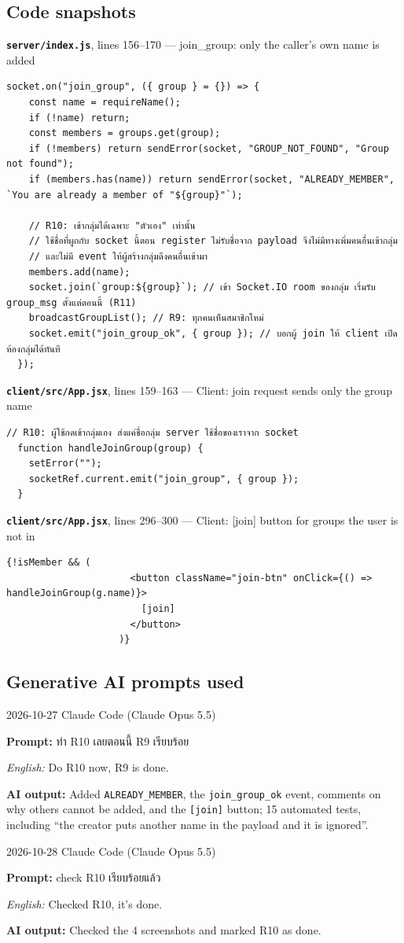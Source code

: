 \documentclass[11pt,a4paper]{article}
\newcommand{\code}[1]{\texttt{#1}}
\newcommand{\snap}[3]{\par\medskip\textbf{\code{#1}}, lines #2 --- #3}
\newcommand{\promptbox}[4]{%
\begin{tcolorbox}[colback=codebg,colframe=gray!50,boxrule=0.4pt,left=4pt,right=4pt,top=2pt,bottom=2pt]
{\small #1 \quad Claude Code (Claude Opus 5.5)}\par
\textbf{Prompt:} #2\par
\textit{English:} #3\par
\textbf{AI output:} #4
\end{tcolorbox}}
\begin{document}
\subsection*{Code snapshots}
\snap{server/index.js}{156--170}{join\_group: only the caller's own name is added}
\begin{Verbatim}[firstnumber=156]
  socket.on("join_group", ({ group } = {}) => {
    const name = requireName();
    if (!name) return;
    const members = groups.get(group);
    if (!members) return sendError(socket, "GROUP_NOT_FOUND", "Group not found");
    if (members.has(name)) return sendError(socket, "ALREADY_MEMBER", `You are already a member of "${group}"`);

    // R10: เข้ากลุ่มได้เฉพาะ "ตัวเอง" เท่านั้น
    // ใช้ชื่อที่ผูกกับ socket นี้ตอน register ไม่รับชื่อจาก payload จึงไม่มีทางเพิ่มคนอื่นเข้ากลุ่ม
    // และไม่มี event ให้ผู้สร้างกลุ่มดึงคนอื่นเข้ามา
    members.add(name);
    socket.join(`group:${group}`); // เข้า Socket.IO room ของกลุ่ม เริ่มรับ group_msg ตั้งแต่ตอนนี้ (R11)
    broadcastGroupList(); // R9: ทุกคนเห็นสมาชิกใหม่
    socket.emit("join_group_ok", { group }); // บอกผู้ join ให้ client เปิดห้องกลุ่มได้ทันที
  });
\end{Verbatim}

\snap{client/src/App.jsx}{159--163}{Client: join request sends only the group name}
\begin{Verbatim}[firstnumber=159]
  // R10: ผู้ใช้กดเข้ากลุ่มเอง ส่งแค่ชื่อกลุ่ม server ใช้ชื่อของเราจาก socket
  function handleJoinGroup(group) {
    setError("");
    socketRef.current.emit("join_group", { group });
  }
\end{Verbatim}

\snap{client/src/App.jsx}{296--300}{Client: [join] button for groups the user is not in}
\begin{Verbatim}[firstnumber=296]
                    {!isMember && (
                      <button className="join-btn" onClick={() => handleJoinGroup(g.name)}>
                        [join]
                      </button>
                    )}
\end{Verbatim}

\subsection*{Generative AI prompts used}
\promptbox{2026-10-27}{ทำ R10 เลยตอนนี้ R9 เรียบร้อย}{Do R10 now, R9 is done.}{Added \code{ALREADY\_MEMBER}, the \code{join\_group\_ok} event, comments on why others cannot be added, and the \code{[join]} button; 15 automated tests, including “the creator puts another name in the payload and it is ignored”.}
\promptbox{2026-10-28}{check R10 เรียบร้อยแล้ว}{Checked R10, it's done.}{Checked the 4 screenshots and marked R10 as done.}
\end{document}
